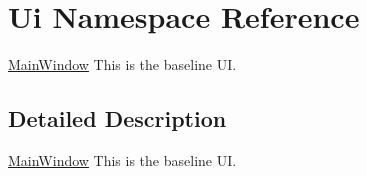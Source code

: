 \hypertarget{namespace_ui}{}\section{Ui Namespace Reference}
\label{namespace_ui}


\hyperlink{class_main_window}{Main\+Window} This is the baseline UI.  




\subsection{Detailed Description}
\hyperlink{class_main_window}{Main\+Window} This is the baseline UI. 